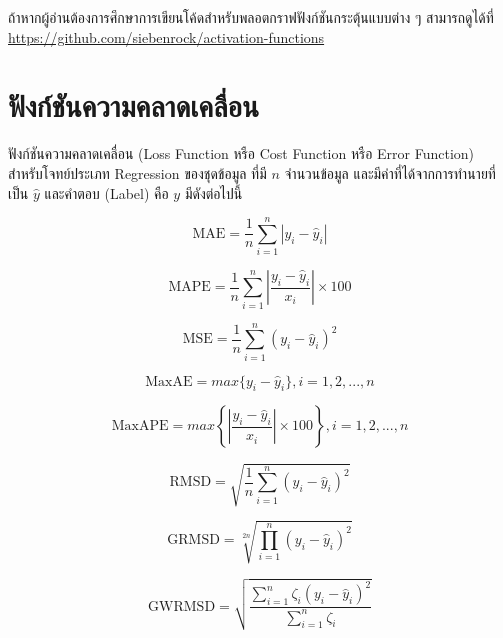 ถ้าหากผู้อ่านต้องการศึกษาการเขียนโค้ดสำหรับพลอตกราฟฟังก์ชันกระตุ้นแบบต่าง ๆ สามารถดูได้ที่ 
\url{https://github.com/siebenrock/activation-functions}

\section{ฟังก์ชันความคลาดเคลื่อน}
\label{sec:loss_func}

ฟังก์ชันความคลาดเคลื่อน (Loss Function หรือ Cost Function หรือ Error Function) สำหรับโจทย์ประเภท Regression ของชุดข้อมูล%
ที่มี $n$ จำนวนข้อมูล และมีค่าที่ได้จากการทำนายที่เป็น $\hat{y}$ และคำตอบ (Label) คือ $y$ มีดังต่อไปนี้

\begin{equation}\label{eq:mae}
    \text{MAE} = \frac{1}{n} \sum_{i=1}^{n} | y_{i} - \hat{y}_{i} |
\end{equation}

\begin{equation}\label{eq:mape}
    \text{MAPE} = \frac{1}{n} \sum_{i=1}^{n} \left| \frac{y_{i} - \hat{y}_{i}}{x_{i}} \right| \times 100
\end{equation}

\begin{equation}\label{eq:mse}
    \text{MSE} = \frac{1}{n} \sum_{i=1}^{n} \left( y_{i} - \hat{y}_{i} \right)^2
\end{equation}

\begin{equation}\label{eq:maxae}
    \text{MaxAE} = max\{y_{i} - \hat{y}_{i}\}, i = 1, 2, ..., n
\end{equation}

\begin{equation}\label{eq:maxape}
    \text{MaxAPE} = max\left\{\left| \frac{y_{i} - \hat{y}_{i}}{x_{i}} \right| \times 100 \right\}, i = 1, 2, ..., n
\end{equation}

\begin{equation}\label{eq:rmsd}
    \text{RMSD} = \sqrt{ \frac{1}{n} \sum_{i=1}^{n} (y_{i} - \hat{y}_{i})^{2} }
\end{equation}

\begin{equation}\label{eq:grmsd}
    \text{GRMSD} = \sqrt[2n]{ \prod_{i=1}^{n} (y_{i} - \hat{y}_{i})^{2} }
\end{equation}

\begin{equation}\label{eq:gwrmsd}
    \text{GWRMSD} = \sqrt{ \frac{\sum_{i=1}^{n} \zeta_{i} (y_{i} - \hat{y}_{i})^{2}}{\sum_{i=1}^{n} \zeta_{i} } }
\end{equation}

